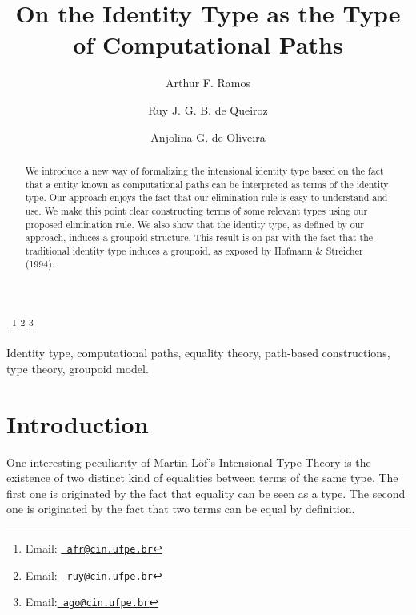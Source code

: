 \documentclass{entcs} \usepackage{entcsmacro}
\begin{document}
\begin{frontmatter}
  \title{On the Identity Type as the Type of Computational Paths} \author{Arthur F. Ramos}
  \address{Centro de Informática\\ Universidade Federal de Pernambuco\\
    Recife, Brazil} 
\author{Ruy J. G. B. de Queiroz}
  \address{Centro de Informática\\Universidade Federal de Pernambuco\\
  Recife, Brazil} 
\author{Anjolina G. de Oliveira}
  \address{Centro de Informática\\Universidade Federal de Pernambuco\\
  Recife, Brazil}
 \ \thanks[myemail]{Email:
    \href{afr@cin.ufpe.br} {\texttt{\normalshape
        afr@cin.ufpe.br}}} \thanks[coemail]{Email:
    \href{ruy@cin.ufpe.br} {\texttt{\normalshape
        ruy@cin.ufpe.br}}}
    \thanks[cocoemail]{Email:\href{ago@cin.ufpe.br} {\texttt{\normalshape
        ago@cin.ufpe.br}}}

\begin{abstract} 
We introduce a new way of formalizing the intensional identity type based on the fact that a entity known as computational paths can be interpreted as terms of the identity type. Our approach enjoys the fact that our elimination rule is easy to understand and use. We make this point clear constructing terms of some relevant types using our proposed elimination rule. We also show that the identity type, as defined by our approach, induces a groupoid structure. This result is on par with the fact that the traditional identity type induces a groupoid, as exposed by Hofmann \& Streicher (1994).
\end{abstract}
\begin{keyword}
Identity type, computational paths, equality theory, path-based constructions, type theory, groupoid model. 
\end{keyword}
\end{frontmatter}
\section{Introduction}\label{intro}

One interesting peculiarity of  Martin-L\"of's Intensional Type Theory is the existence of two distinct kind of equalities between terms of the same type. The first one is originated by the fact that equality can be seen as a type. The second one is originated by the fact that two terms can be equal by definition.
\end{document}

